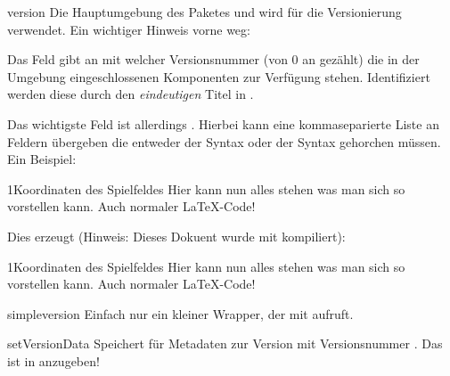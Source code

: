 \documentclass{sopra-base}
\begin{document}
\begin{environment}{version}{}
    Die Hauptumgebung des Paketes und wird für die Versionierung verwendet. Ein wichtiger Hinweis vorne weg: \par{}
    Das Feld  gibt an mit welcher Versionsnummer (von \(0\) an gezählt) die in der Umgebung eingeschlossenen Komponenten zur Verfügung stehen. Identifiziert werden diese durch den \emph{eindeutigen} Titel in .\par{}
    Das wichtigste Feld ist allerdings . Hierbei kann eine kommaseparierte Liste an Feldern übergeben die entweder der Syntax  oder der Syntax  gehorchen müssen. Ein Beispiel:
\begin{latex}
\begin{version}{1}{Koordinaten des Spielfeldes}
    Hier kann nun alles stehen was man sich so vorstellen kann. Auch normaler \LaTeX-Code!
\end{version}
\end{latex}
    Dies erzeugt (Hinweis: Dieses Dokuent wurde mit  kompiliert):\\
\begin{version}{1}{Koordinaten des Spielfeldes}
Hier kann nun alles stehen was man sich so vorstellen kann. Auch normaler \LaTeX-Code!
\end{version}
\end{environment}

\begin{command}{simpleversion}{}
    Einfach nur ein kleiner Wrapper, der  mit  aufruft.
\end{command}

\begin{command}{setVersionData}{}
    Speichert für  Metadaten zur Version mit Versionsnummer . Das  ist in  anzugeben!
\end{command}
\end{document}
